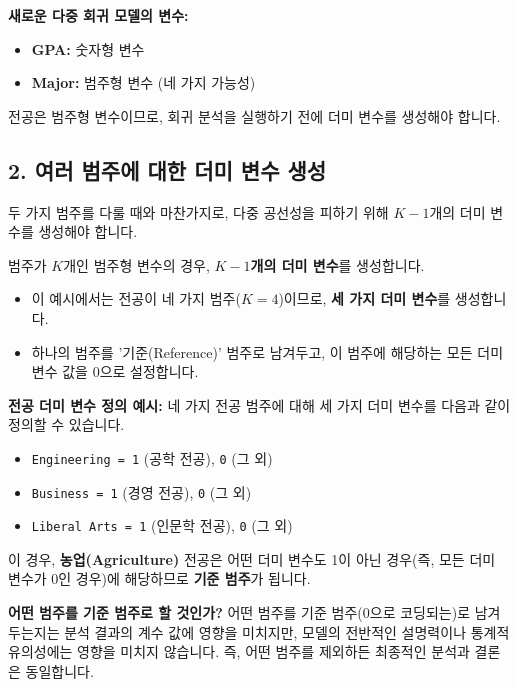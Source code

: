 \documentclass[11pt,a4paper]{article}
\theoremstyle{definition}
\begin{document}
\textbf{새로운 다중 회귀 모델의 변수:}
\begin{itemize}
    \item \textbf{GPA:} 숫자형 변수
    \item \textbf{Major:} 범주형 변수 (네 가지 가능성)
\end{itemize}
전공은 범주형 변수이므로, 회귀 분석을 실행하기 전에 더미 변수를 생성해야 합니다.

\subsection{2. 여러 범주에 대한 더미 변수 생성}
두 가지 범주를 다룰 때와 마찬가지로, 다중 공선성을 피하기 위해 $K-1$개의 더미 변수를 생성해야 합니다.

\begin{tcolorbox}[definition={더미 변수 생성 규칙 (여러 범주)}]
범주가 $K$개인 범주형 변수의 경우, \textbf{$K-1$개의 더미 변수}를 생성합니다.
\begin{itemize}
    \item 이 예시에서는 전공이 네 가지 범주($K=4$)이므로, \textbf{세 가지 더미 변수}를 생성합니다.
    \item 하나의 범주를 '기준(Reference)' 범주로 남겨두고, 이 범주에 해당하는 모든 더미 변수 값을 0으로 설정합니다.
\end{itemize}
\end{tcolorbox}

\textbf{전공 더미 변수 정의 예시:}
네 가지 전공 범주에 대해 세 가지 더미 변수를 다음과 같이 정의할 수 있습니다.
\begin{itemize}
    \item \texttt{Engineering = 1} (공학 전공), \texttt{0} (그 외)
    \item \texttt{Business = 1} (경영 전공), \texttt{0} (그 외)
    \item \texttt{Liberal Arts = 1} (인문학 전공), \texttt{0} (그 외)
\end{itemize}
이 경우, \textbf{농업(Agriculture)} 전공은 어떤 더미 변수도 1이 아닌 경우(즉, 모든 더미 변수가 0인 경우)에 해당하므로 \textbf{기준 범주}가 됩니다.

\begin{infobox}
\textbf{어떤 범주를 기준 범주로 할 것인가?}
어떤 범주를 기준 범주(0으로 코딩되는)로 남겨두는지는 분석 결과의 계수 값에 영향을 미치지만, 모델의 전반적인 설명력이나 통계적 유의성에는 영향을 미치지 않습니다. 즉, 어떤 범주를 제외하든 최종적인 분석과 결론은 동일합니다.
\end{infobox}
\end{document}
